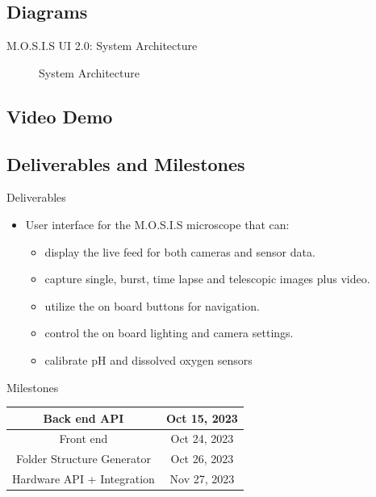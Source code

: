 \documentclass[17pt, aspectratio=169]{beamer}
\begin{document}
\subsection*{Diagrams}\begin{frame}{M.O.S.I.S UI 2.0: System Architecture}
	\begin{figure}
		\caption{System Architecture}
	\end{figure}
\end{frame}
\subsection{Video Demo}
\subsection*{Deliverables and Milestones}
\begin{frame}{Deliverables}
	\begin{itemize}
		\item User interface for the M.O.S.I.S microscope that can:
		      \begin{itemize}
			      \item display the live feed for both cameras and sensor data.
			      \item capture single, burst, time lapse and telescopic images plus video.
			      \item utilize the on board buttons for navigation.
			      \item control the on board lighting and camera settings.
			      \item calibrate pH and dissolved oxygen sensors
		      \end{itemize}
	\end{itemize}

\end{frame}
\begin{frame}{Milestones}
	\begin{tabular}{||c | c||}
		\hline
		Back end API               & Oct 15, 2023 \\
		\hline
		Front end                  & Oct 24, 2023 \\
		\hline
		Folder Structure Generator & Oct 26, 2023 \\
		\hline
		Hardware API + Integration & Nov 27, 2023 \\
		\hline
	\end{tabular}
\end{frame}
\end{document}
